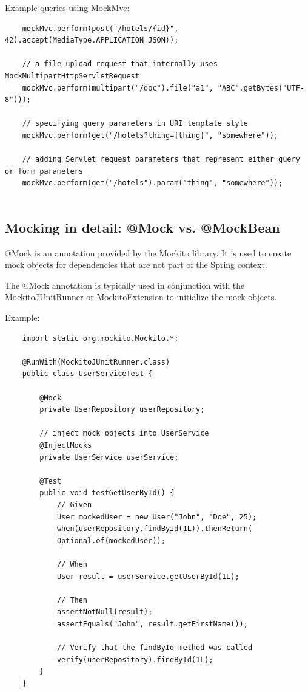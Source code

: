 \documentclass{scrartcl}
\begin{document}
Example queries using MockMvc:

\begin{lstlisting}
    mockMvc.perform(post("/hotels/{id}", 42).accept(MediaType.APPLICATION_JSON));

    // a file upload request that internally uses MockMultipartHttpServletRequest
    mockMvc.perform(multipart("/doc").file("a1", "ABC".getBytes("UTF-8")));

    // specifying query parameters in URI template style
    mockMvc.perform(get("/hotels?thing={thing}", "somewhere"));

    // adding Servlet request parameters that represent either query or form parameters
    mockMvc.perform(get("/hotels").param("thing", "somewhere"));


\end{lstlisting}


\subsection{Mocking in detail: @Mock vs. @MockBean}

@Mock is an annotation provided by the Mockito library. It is used to create mock objects for dependencies that are not part of the Spring context.

The @Mock annotation is typically used in conjunction with the MockitoJUnitRunner or MockitoExtension to initialize the mock objects.

Example:

\begin{lstlisting}
    import static org.mockito.Mockito.*;

    @RunWith(MockitoJUnitRunner.class)
    public class UserServiceTest {

        @Mock
        private UserRepository userRepository;

        // inject mock objects into UserService
        @InjectMocks
        private UserService userService;

        @Test
        public void testGetUserById() {
            // Given
            User mockedUser = new User("John", "Doe", 25);
            when(userRepository.findById(1L)).thenReturn(
            Optional.of(mockedUser));

            // When
            User result = userService.getUserById(1L);

            // Then
            assertNotNull(result);
            assertEquals("John", result.getFirstName());

            // Verify that the findById method was called
            verify(userRepository).findById(1L);
        }
    }
\end{lstlisting}
\end{document}
